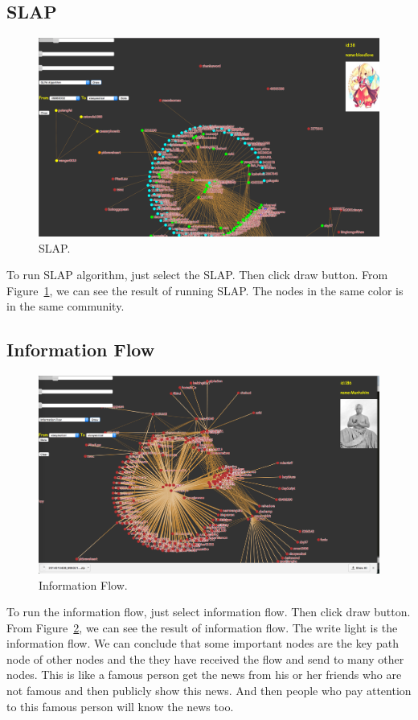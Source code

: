 \documentclass{article}
\begin{document}
\subsection{SLAP}
\begin{figure}[H]
  \centering
  \includegraphics[width=0.75\columnwidth]{slap.png}
  \caption{SLAP.}
  \label{fig:slap}
\end{figure}
To run SLAP algorithm, just select the SLAP. Then click draw button. From Figure~\ref{fig:slap}, we can see the result of running SLAP. The nodes in the same color is in the same community. \\ 

\subsection{Information Flow}
\begin{figure}[H]
  \centering
  \includegraphics[width=0.75\columnwidth]{if.png}
  \caption{Information Flow.}
  \label{fig:if}
\end{figure}
To run the information flow, just select information flow. Then click draw button. From Figure~\ref{fig:if}, we can see the result of information flow. The write light is the information flow. We can conclude that some important nodes are the key path node of other nodes and the they have received the flow and send to many other nodes. This is like a famous person get the news from his or her friends who are not famous and then publicly show this news. And then people who pay attention to this famous person will know the news too.\\
\end{document}
